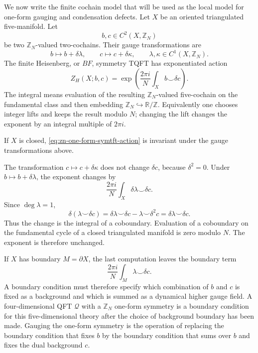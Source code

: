 We now write the finite cochain model that will be used as the local model for
one-form gauging and condensation defects.  Let \(X\) be an oriented
triangulated five-manifold.  Let
\[
  b,c\in C^2(X,\mathbb Z_N)
\]
be two \(\mathbb Z_N\)-valued two-cochains.  Their gauge transformations are
\[
  b\mapsto b+\delta\lambda,\qquad
  c\mapsto c+\delta\kappa,
  \qquad
  \lambda,\kappa\in C^1(X,\mathbb Z_N).
\]
The finite Heisenberg, or \(BF\), symmetry TQFT has exponentiated action
\begin{equation}
  Z_H(X;b,c)
  =
  \exp\left(\frac{2\pi i}{N}\int_X b\smile\delta c\right).
  \label{eq:zn-one-form-symtft-action}
\end{equation}
The integral means evaluation of the resulting \(\mathbb Z_N\)-valued
five-cochain on the fundamental class and then embedding
\(\mathbb Z_N\hookrightarrow \mathbb R/\mathbb Z\).  Equivalently one chooses
integer lifts and keeps the result modulo \(N\); changing the lift changes the
exponent by an integral multiple of \(2\pi i\).

\begin{remark}
\label{rem:zn-one-form-symtft-gauge-invariance}
If \(X\) is closed, \eqref{eq:zn-one-form-symtft-action} is invariant under
the gauge transformations above.

The transformation \(c\mapsto c+\delta\kappa\) does not change \(\delta c\),
because \(\delta^2=0\).  Under \(b\mapsto b+\delta\lambda\), the exponent
changes by
\[
  \frac{2\pi i}{N}\int_X \delta\lambda\smile\delta c .
\]
Since \(\deg\lambda=1\),
\[
  \delta(\lambda\smile\delta c)
  =
  \delta\lambda\smile\delta c
  -\lambda\smile\delta^2c
  =
  \delta\lambda\smile\delta c .
\]
Thus the change is the integral of a coboundary.  Evaluation of a coboundary on
the fundamental cycle of a closed triangulated manifold is zero modulo \(N\).
The exponent is therefore unchanged.
\end{remark}

If \(X\) has boundary \(M=\partial X\), the last computation leaves the
boundary term
\[
  \frac{2\pi i}{N}\int_M \lambda\smile\delta c .
\]
A boundary condition must therefore specify which combination of \(b\) and
\(c\) is fixed as a background and which is summed as a dynamical higher gauge
field.  A four-dimensional QFT \(\mathcal Q\) with a \(\mathbb Z_N\) one-form
symmetry is a boundary condition for this five-dimensional theory after the
choice of background boundary has been made.  Gauging the one-form symmetry is
the operation of replacing the boundary condition that fixes \(b\) by the
boundary condition that sums over \(b\) and fixes the dual background \(c\).

